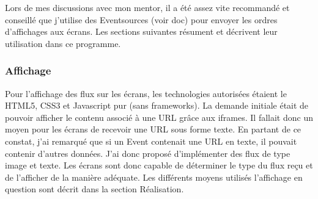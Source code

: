 \documentclass[french]{article}
\begin{document}
Lors de mes discussions avec mon mentor, il a été assez vite recommandé et conseillé que j'utilise des Eventsources (voir doc) pour envoyer les ordres d'affichages aux écrans. Les sections suivantes résument et décrivent leur utilisation dans ce programme.

\subsubsection{Affichage}
Pour l'affichage des flux sur les écrans, les technologies autorisées étaient le HTML5, CSS3 et Javascript pur (sans frameworks). La demande initiale était de pouvoir afficher le contenu associé à une URL grâce aux iframes. Il fallait donc un moyen pour les écrans de recevoir une URL sous forme texte. En partant de ce constat, j'ai remarqué que si un Event contenait une URL en texte, il pouvait contenir d'autres données. J'ai donc proposé d'implémenter des flux de type image et texte. \newline
Les écrans sont donc capable de déterminer le type du flux reçu et de l'afficher de la manière adéquate. Les différents moyens utilisés l'affichage en question sont décrit dans la section Réalisation.
\end{document}
